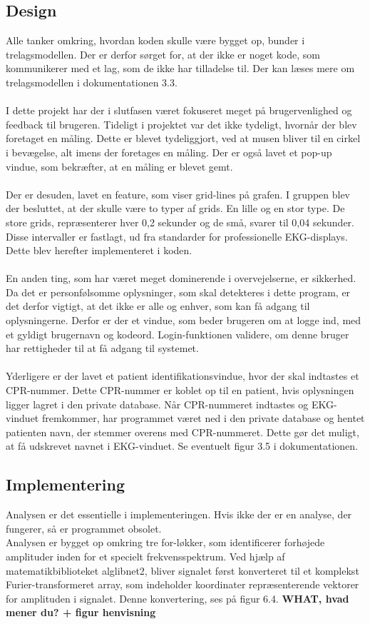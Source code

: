 \subsection{Design}
Alle tanker omkring, hvordan koden skulle være bygget op, bunder i trelagsmodellen. Der er derfor sørget for, at der ikke er noget kode, som kommunikerer med et lag, som de ikke har tilladelse til. Der kan læses mere om trelagsmodellen i dokumentationen 3.3.\\ \\
I dette projekt har der i slutfasen været fokuseret meget på brugervenlighed og feedback til brugeren. Tideligt i projektet var det ikke tydeligt, hvornår der blev foretaget en måling. Dette er blevet tydeliggjort, ved at musen bliver til en cirkel i bevægelse, alt imens der foretages en måling. Der er også lavet et pop-up vindue, som bekræfter, at en måling er blevet gemt.\\ \\
Der er desuden, lavet en feature, som viser grid-lines på grafen. I gruppen blev der besluttet, at der skulle være to typer af grids. En lille og en stor type.  De store grids, repræsenterer hver 0,2 sekunder og de små, svarer til 0,04 sekunder. Disse intervaller er fastlagt, ud fra standarder for professionelle EKG-displays.  Dette blev herefter implementeret i koden.\\ \\
En anden ting, som har været meget dominerende i overvejelserne, er sikkerhed. Da det er personfølsomme oplysninger, som skal detekteres i dette program, er det derfor vigtigt, at det ikke er alle og enhver, som kan få adgang til oplysningerne. Derfor er der et vindue, som beder brugeren om at logge ind, med et gyldigt brugernavn og kodeord. Login-funktionen validere, om denne bruger har rettigheder til at få adgang til systemet.\\ \\
Yderligere er der lavet et patient identifikationsvindue, hvor der skal indtastes et CPR-nummer. Dette CPR-nummer er koblet op til en patient, hvis oplysningen ligger lagret i den private database. Når CPR-nummeret indtastes og EKG-vinduet fremkommer, har programmet været ned i den private database og hentet patienten navn, der stemmer overens med CPR-nummeret. Dette gør det muligt, at få udskrevet navnet i EKG-vinduet. Se eventuelt figur 3.5 i dokumentationen.   

\subsection{Implementering}
Analysen er det essentielle i implementeringen. Hvis ikke der er en analyse, der fungerer, så er programmet obsolet.\\
Analysen er bygget op omkring tre for-løkker, som identificerer forhøjede amplituder inden for et specielt frekvensspektrum. Ved hjælp af matematikbiblioteket alglibnet2, bliver signalet først konverteret til et komplekst Furier-transformeret array, som indeholder koordinater repræsenterende vektorer for amplituden i signalet. Denne konvertering, ses på figur 6.4. \textbf{WHAT, hvad mener du? + figur henvisning} 

